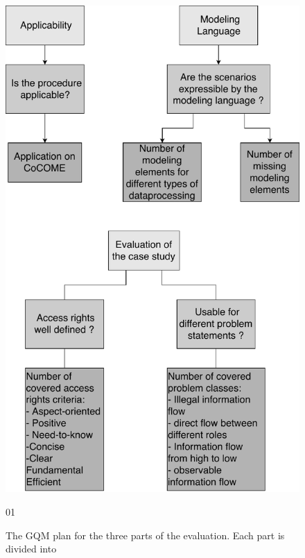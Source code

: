 \begin{figure}
\includegraphics[scale=.8, origin=c ]{logos/OverviewEval.pdf}
\caption{The GQM plan for the three parts of the evaluation. Each part is divided into }01
\label{GQMPlan}
\end{figure}

